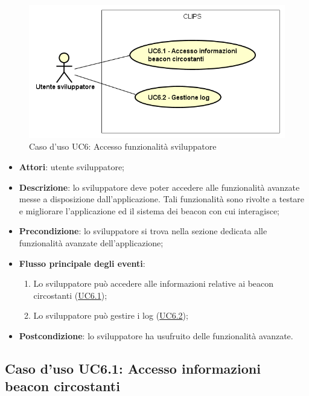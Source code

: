 \documentclass[../AnalisiDeiRequisiti.tex]{subfiles}
\begin{document}
\begin{figure}[H]
	\centering
	\includegraphics[scale=0.95, width=\textwidth]{img/UC6.png}
	\caption{Caso d'uso UC6: Accesso funzionalità sviluppatore}\label{fig:UC6} 
\end{figure}
\begin{itemize}
	\item \textbf{Attori}: utente sviluppatore;
	\item \textbf{Descrizione}: lo sviluppatore deve poter accedere alle funzionalità avanzate messe a disposizione dall'applicazione. Tali funzionalità sono rivolte a testare e migliorare l'applicazione ed il sistema dei beacon con cui interagisce; 
	\item \textbf{Precondizione}: lo sviluppatore si trova nella sezione dedicata alle funzionalità avanzate dell'applicazione;
	
	\item \textbf{Flusso principale degli eventi}:
	\begin{enumerate}
		\item Lo sviluppatore può accedere alle informazioni relative ai beacon circostanti (\hyperlink{UC6.1}{UC6.1});
		\item Lo sviluppatore può gestire i log (\hyperlink{UC6.2}{UC6.2});
		
	\end{enumerate}
	\item \textbf{Postcondizione}: lo sviluppatore ha usufruito delle funzionalità avanzate.
\end{itemize}
\hypertarget{UC6.1}{}
\subsection{Caso d'uso UC6.1: Accesso informazioni beacon circostanti}
\end{document}
